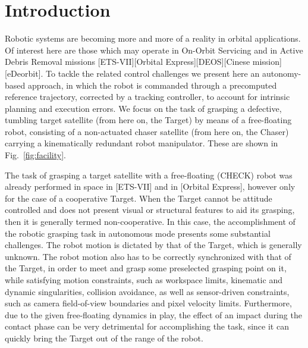 \section{Introduction}
%
Robotic systems are becoming more and more of a reality in orbital applications. Of interest here are those which may operate in On-Orbit Servicing and in Active Debris Removal missions [ETS-VII][Orbital Express][DEOS][Cinese mission][eDeorbit]. To tackle the related control challenges we present here an autonomy-based approach, in which the robot is commanded through a precomputed reference trajectory, corrected by a tracking controller, to account for intrinsic planning and execution errors. We focus on the task of grasping a defective, tumbling target satellite (from here on, the Target) by means of a free-floating robot, consisting of a non-actuated chaser satellite (from here on, the Chaser) carrying a kinematically redundant robot manipulator. These are shown in Fig.~\ref{fig:facility}.

The task of grasping a target satellite with a free-floating (CHECK) robot was already performed in space in [ETS-VII] and in [Orbital Express], however only for the case of a cooperative Target. When the Target cannot be attitude controlled and does not present visual or structural features to aid its grasping, then it is generally termed non-cooperative. In this case, the accomplishment of the robotic grasping task in autonomous mode presents some substantial challenges. The robot motion is dictated by that of the Target, which is generally unknown. The robot motion also has to be correctly synchronized with that of the Target, in order to meet and grasp some preselected grasping point on it, while satisfying motion constraints, such as workspace limits, kinematic and dynamic singularities, collision avoidance, as well as sensor-driven constraints, such as camera field-of-view boundaries and pixel velocity limits. Furthermore, due to the given free-floating dynamics in play, the effect of an impact during the contact phase can be very detrimental for accomplishing the task, since it can quickly bring the Target out of the range of the robot.


